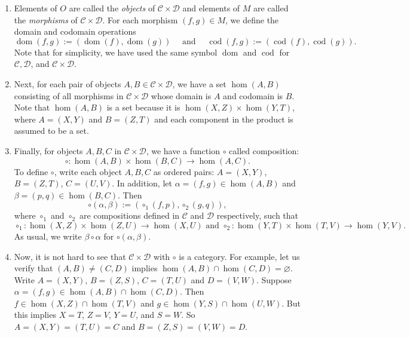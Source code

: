 \documentclass[12pt]{article}
\begin{document}
\begin{enumerate}
\item
Elements of $O$ are called the \emph{objects} of $\mathcal{C}\times \mathcal{D}$ and elements of $M$ are called the \emph{morphisms} of $\mathcal{C}\times\mathcal{D}$.  For each morphism $(f,g)\in M$, we define the domain and codomain operations $$\operatorname{dom}(f,g):=(\operatorname{dom}(f), \operatorname{dom}(g))\quad\mbox{ and }\quad \operatorname{cod}(f,g):=(\operatorname{cod}(f), \operatorname{cod}(g)).$$  Note that for simplicity, we have used the same symbol $\operatorname{dom}$ and $\operatorname{cod}$ for $\mathcal{C},\mathcal{D}$, and $\mathcal{C}\times \mathcal{D}$.
\item
Next, for each pair of objects $A,B\in \mathcal{C}\times\mathcal{D}$, we have a set $\hom(A,B)$ consisting of all morphisms in $\mathcal{C}\times \mathcal{D}$ whose domain is $A$ and codomain is $B$.  Note that $\hom(A,B)$ is a set because it is $\hom(X,Z)\times \hom(Y,T)$, where $A=(X,Y)$ and $B=(Z,T)$ and each component in the product is assumed to be a set.
\item
Finally, for objects $A,B,C$ in $\mathcal{C}\times\mathcal{D}$, we have a function $\circ$ called composition: 
$$\circ:\hom(A,B)\times \hom(B,C)\to \hom(A,C).$$  To define $\circ$, write each object $A,B,C$ as ordered pairs: $A=(X,Y)$, $B=(Z,T)$, $C=(U,V)$.  In addition, let $\alpha=(f,g)\in \hom(A,B)$ and $\beta=(p,q)\in \hom(B,C)$.  Then $$\circ(\alpha,\beta):=(\circ_1(f,p),\circ_2(g,q)),$$ where $\circ_1$ and $\circ_2$ are compositions defined in $\mathcal{C}$ and $\mathcal{D}$ respectively, such that 
$$\circ_1:\hom(X,Z)\times \hom(Z,U)\to \hom(X,U)\mbox{ and }\circ_2:\hom(Y,T)\times \hom(T,V)\to \hom(Y,V).$$
As usual, we write $\beta\circ \alpha$ for $\circ(\alpha,\beta)$.
\item
Now, it is not hard to see that $\mathcal{C}\times \mathcal{D}$ with $\circ$ is a category.  For example, let us verify that $(A,B)\ne (C,D)$ implies $\hom(A,B)\cap \hom(C,D)=\varnothing$.  Write $A=(X,Y)$, $B=(Z,S)$, $C=(T,U)$ and $D=(V,W)$.  Suppose $\alpha=(f,g)\in \hom(A,B)\cap \hom(C,D)$.  Then $f\in \hom(X,Z)\cap \hom(T,V)$ and $g\in \hom(Y,S)\cap \hom(U,W)$.  But this implies $X=T$, $Z=V$, $Y=U$, and $S=W$.  So $A=(X,Y)=(T,U)=C$ and $B=(Z,S)=(V,W)=D$.
\end{enumerate}
\end{document}
